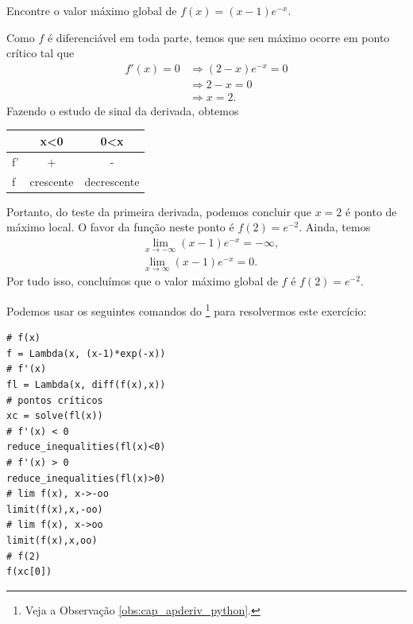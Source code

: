 \begin{exeresol}
  Encontre o valor máximo global de $f(x) = (x-1)e^{-x}$.
\end{exeresol}
\begin{resol}
  Como $f$ é diferenciável em toda parte, temos que seu máximo ocorre em ponto crítico tal que
  \begin{align}
    f'(x) = 0 &\Rightarrow (2-x)e^{-x} = 0 \\
              &\Rightarrow 2-x = 0 \\
              &\Rightarrow x = 2.
  \end{align}
  Fazendo o estudo de sinal da derivada, obtemos
  \begin{center}
    \begin{tabular}[H]{lcc}
         & x<0 & 0<x \\\hline
      f' & + & - \\
      f  & crescente & decrescente \\\hline
    \end{tabular}
  \end{center}
  Portanto, do teste da primeira derivada, podemos concluir que $x=2$ é ponto de máximo local. O favor da função neste ponto é $f(2) = e^{-2}$. Ainda, temos
  \begin{align}
    &\lim_{x\to -\infty} (x-1)e^{-x} = -\infty, \\
    &\lim_{x\to \infty} (x-1)e^{-x} = 0.
  \end{align}
  Por tudo isso, concluímos que o valor máximo global de $f$ é $f(2) = e^{-2}$.

  \ifispython
  Podemos usar os seguintes comandos do \sympy\footnote{Veja a Observação \ref{obs:cap_apderiv_python}.} para resolvermos este exercício:
\begin{verbatim}
# f(x)
f = Lambda(x, (x-1)*exp(-x))
# f'(x)
fl = Lambda(x, diff(f(x),x))
# pontos críticos
xc = solve(fl(x))
# f'(x) < 0
reduce_inequalities(fl(x)<0)
# f'(x) > 0
reduce_inequalities(fl(x)>0)
# lim f(x), x->-oo
limit(f(x),x,-oo)
# lim f(x), x->oo
limit(f(x),x,oo)
# f(2)
f(xc[0])
\end{verbatim}
  \fi
\end{resol}



